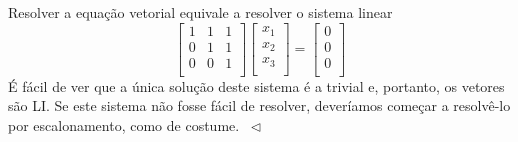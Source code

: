 \documentclass[../livro.tex]{subfiles}
\begin{document}
\begin{example}
Resolver a equação vetorial equivale a resolver o sistema linear
\begin{equation}
\left[
  \begin{array}{ccc}
    1 & 1 & 1 \\
    0 & 1 & 1 \\
    0 & 0 & 1 \\
  \end{array}
\right]
\left[
  \begin{array}{c}
    x_1 \\
    x_2 \\
    x_3 \\
  \end{array}
\right] =
\left[
  \begin{array}{c}
    0 \\
    0 \\
    0 \\
  \end{array}
\right]
\end{equation} É fácil de ver que a única solução deste sistema é a trivial e, portanto, os vetores são LI. Se este sistema não fosse fácil de resolver, deveríamos começar a resolvê-lo por escalonamento, como de costume. $\ \lhd$
\end{example}
\end{document}
